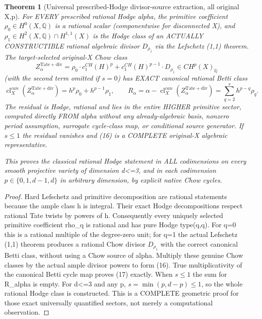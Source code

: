 \documentclass[11pt]{article}
\newtheorem{theorem}{Theorem}[section]
\begin{document}
\begin{theorem}[Universal prescribed-Hodge divisor-source extraction, all original X,p]
For EVERY prescribed rational Hodge alpha,
the primitive coefficient $\rho_0\in H^0(X,\mathbb Q)$
is a rational scalar (componentwise for disconnected X),
and $\rho_1\in H^2(X,\mathbb Q)\cap H^{1,1}(X)$
is the Hodge class of an ACTUALLY CONSTRUCTIBLE
rational algebraic divisor $D_{\rho_1}$ via the
Lefschetz (1,1) theorem.
The target-selected original-X Chow class
\[
 \boxed{
 Z_{\alpha}^{\mathrm{Tate+div}}=
  \rho_0\cdot c_1^{CH}(H)^p
  +c_1^{CH}(H)^{p-1}\cdot D_{\rho_1}
 \in CH^p(X)_\mathbb Q
 }                                                       \tag{16}
\]
(with the second term omitted if $s=0$)
has EXACT canonical rational Betti class
\[
 \boxed{
 \operatorname{cl}^{can}_X
     (Z_\alpha^{\mathrm{Tate+div}})
      =h^p\rho_0+h^{p-1}\rho_1,\qquad
 R_\alpha=
 \alpha-\operatorname{cl}^{can}_X
                 (Z_\alpha^{\mathrm{Tate+div}})
 =\sum_{q=2}^{s}h^{p-q}\rho_q.
 }                                                       \tag{17}
\]
The residual is Hodge, rational and lies in
the entire HIGHER primitive sector, computed
directly FROM alpha without any already-algebraic
basis, nonzero period assumption, surrogate
cycle-class map, or conditional source generator.
If $s\le1$ the residual vanishes and (16)
is a COMPLETE original-X algebraic representative.

This proves the classical rational Hodge statement
in ALL codimensions on every smooth projective
variety of dimension d<=3, and in each
codimension $p\in\{0,1,d-1,d\}$ in arbitrary
dimension, by explicit native Chow cycles.
\end{theorem}
\begin{proof}
Hard Lefschetz and primitive decomposition are
rational statements because the ample class h
is integral. Their exact Hodge decompositions
respect rational Tate twists by powers of h.
Consequently every uniquely selected primitive
coefficient rho_q is rational and has
pure Hodge type(q,q).
For q=0 this is a rational multiple of
the degree-zero unit; for q=1 the actual
Lefschetz (1,1) theorem produces a rational
Chow divisor $D_{\rho_1}$ with the correct
canonical Betti class, without using a
Chow source of alpha.
Multiply these genuine Chow classes by
the actual ample divisor powers to form (16).
True multiplicativity of the canonical
Betti cycle map proves (17) exactly.
When $s\le1$ the sum for R_alpha is empty.
For d<=3 and any p,
$s=\min(p,d-p)\le1$, so the
whole rational Hodge class is constructed.
This is a COMPLETE geometric proof for
those exact universally quantified sectors,
not merely a computational observation.
\end{proof}
\end{document}
